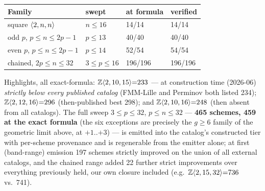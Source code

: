 \begin{center}
\begin{tabular}{llll}
\hline
Family & swept & at formula & verified \\
\hline
square \(\langle 2, n, n \rangle\) & \(n \le 16\) & 14/14 & 14/14 \\
odd \(p\), \(p \le n \le 2p{-}1\) & \(p \le 13\) & 40/40 & 40/40 \\
even \(p\), \(p \le n \le 2p{-}1\) & \(p \le 14\) & 52/54 & 54/54 \\
chained, \(2p \le n \le 32\) & \(3 \le p \le 16\) & 196/196 & 196/196 \\
\hline
\end{tabular}
\end{center}

Highlights, all exact-formula:
\(\mathbb{Z}\langle 2, 10, 15 \rangle{=}233\) — at construction time
(2026-06) \emph{strictly below every published catalog} (FMM-Lille and
Perminov both listed 234);
\(\mathbb{Z}\langle 2, 12, 16 \rangle{=}296\) (then-published best 298); and
\(\mathbb{Z}\langle 2, 10, 16 \rangle{=}248\) (then absent from all catalogs).
The full sweep \(3 \le p \le 32\), \(p \le n \le 32\) — \textbf{465
schemes, 459 at the exact formula} (the six exceptions are precisely the
\(g \ge 6\) family of the geometric limit above, at \(+1\)..\(+3\)) — is
emitted into the catalog's constructed tier with per-scheme provenance and
is regenerable from the emitter alone; at first (band-range) emission 197
schemes strictly improved on the union of all external catalogs, and the
chained range added 22 further strict improvements over everything
previously held, our own closure included
(e.g.\ \(\mathbb{Z}\langle 2, 15, 32 \rangle{=}736\) vs.\ 741).

